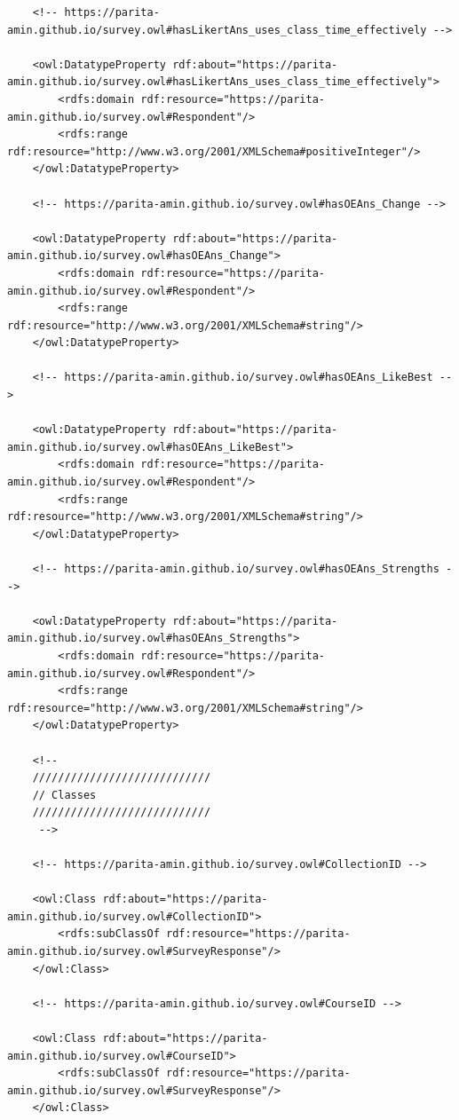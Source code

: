 \begin{lstlisting}
    <!-- https://parita-amin.github.io/survey.owl#hasLikertAns_uses_class_time_effectively -->

    <owl:DatatypeProperty rdf:about="https://parita-amin.github.io/survey.owl#hasLikertAns_uses_class_time_effectively">
        <rdfs:domain rdf:resource="https://parita-amin.github.io/survey.owl#Respondent"/>
        <rdfs:range rdf:resource="http://www.w3.org/2001/XMLSchema#positiveInteger"/>
    </owl:DatatypeProperty>
    
    <!-- https://parita-amin.github.io/survey.owl#hasOEAns_Change -->

    <owl:DatatypeProperty rdf:about="https://parita-amin.github.io/survey.owl#hasOEAns_Change">
        <rdfs:domain rdf:resource="https://parita-amin.github.io/survey.owl#Respondent"/>
        <rdfs:range rdf:resource="http://www.w3.org/2001/XMLSchema#string"/>
    </owl:DatatypeProperty>
    
    <!-- https://parita-amin.github.io/survey.owl#hasOEAns_LikeBest -->

    <owl:DatatypeProperty rdf:about="https://parita-amin.github.io/survey.owl#hasOEAns_LikeBest">
        <rdfs:domain rdf:resource="https://parita-amin.github.io/survey.owl#Respondent"/>
        <rdfs:range rdf:resource="http://www.w3.org/2001/XMLSchema#string"/>
    </owl:DatatypeProperty>
    
    <!-- https://parita-amin.github.io/survey.owl#hasOEAns_Strengths -->

    <owl:DatatypeProperty rdf:about="https://parita-amin.github.io/survey.owl#hasOEAns_Strengths">
        <rdfs:domain rdf:resource="https://parita-amin.github.io/survey.owl#Respondent"/>
        <rdfs:range rdf:resource="http://www.w3.org/2001/XMLSchema#string"/>
    </owl:DatatypeProperty>
    
    <!-- 
    ////////////////////////////
    // Classes
    ////////////////////////////
     -->

    <!-- https://parita-amin.github.io/survey.owl#CollectionID -->

    <owl:Class rdf:about="https://parita-amin.github.io/survey.owl#CollectionID">
        <rdfs:subClassOf rdf:resource="https://parita-amin.github.io/survey.owl#SurveyResponse"/>
    </owl:Class>
    
    <!-- https://parita-amin.github.io/survey.owl#CourseID -->

    <owl:Class rdf:about="https://parita-amin.github.io/survey.owl#CourseID">
        <rdfs:subClassOf rdf:resource="https://parita-amin.github.io/survey.owl#SurveyResponse"/>
    </owl:Class>
    

\end{lstlisting}
